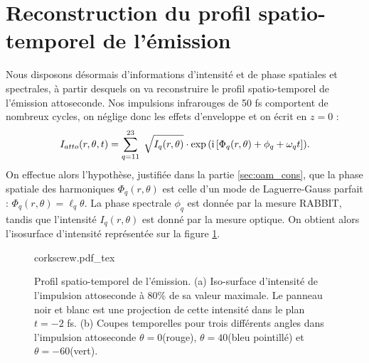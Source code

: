 \section{Reconstruction du profil spatio-temporel de l'émission}
Nous disposons désormais d'informations d'intensité et de phase spatiales et spectrales, à partir desquels on va reconstruire le profil spatio-temporel de l'émission attoseconde. Nos impulsions infrarouges de 50 fs comportent de nombreux cycles, on néglige donc les effets d'enveloppe et on écrit en $z = 0$ :
\begin{equation*}
I_{atto}(r,\theta,t) = \sum_{q=11}^{23}\;\sqrt{I_q(r,\theta)}\cdot\exp{(\mathrm{i}\left[\Phi_q(r,\theta)+\phi_q+\omega_q t\right])}.
\end{equation*}
On effectue alors l'hypothèse, justifiée dans la partie \ref{sec:oam_cons}, que la phase spatiale des harmoniques $\Phi_q(r,\theta)$ est celle d'un mode de Laguerre-Gauss parfait : $\Phi_q(r,\theta) = \ell_q \theta$. La phase spectrale $\phi_q$ est donnée par la mesure RABBIT, tandis que l'intensité $I_q(r,\theta)$ est donné par la mesure optique. On obtient alors l'isosurface d'intensité représentée sur la figure \ref{Fig:corkscrew}.

\begin{figure}[!ht]
\centering
\def\svgwidth{\columnwidth}
{corkscrew.pdf_tex}
\caption{Profil spatio-temporel de l'émission. (a) Iso-surface d'intensité de l'impulsion attoseconde à 80\% de sa valeur maximale. Le panneau noir et blanc est une projection de cette intensité dans le plan $t=-2$ fs. (b) Coupes temporelles pour trois différents angles dans l'impulsion attoseconde $\theta=0$\degres (rouge), $\theta=40$\degres (bleu pointillé) et $\theta=-60$\degres (vert).}
\label{Fig:corkscrew}
\end{figure}

